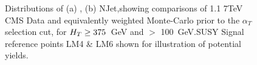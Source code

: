 \begin{figure}[htpb]
\centering
\begin{minipage}[b]{1.\linewidth}
\centering
{}
\hspace{0.2cm}
\end{minipage}
    \caption{\label{fig:preselplota}Distributions of (a) \HT, (b) NJet,showing comparisons of 1.1  7TeV CMS Data and equivalently weighted Monte-Carlo prior to the $\alpha_{T}$ selection cut, for $H_{T}  \geq 375$~GeV and \MHT $>$ 100~GeV.SUSY Signal reference points LM4 \& LM6 shown for illustration of potential yields.}
\end{figure}

